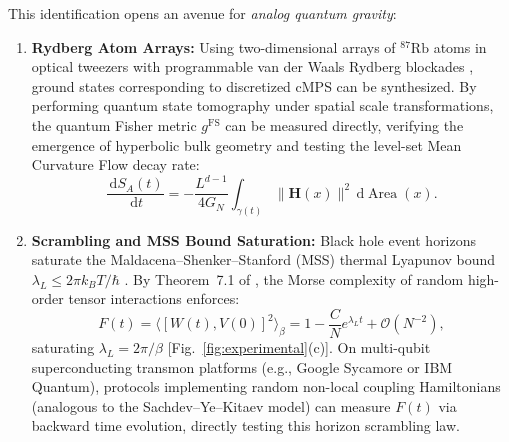 \documentclass[aps,prl,reprint,twocolumn,superscriptaddress,nofootinbib,floatfix]{revtex4-2}
\newcommand{\dif}{\,\mathrm{d}}
\newcommand{\Area}{\operatorname{Area}}
\begin{document}
This identification opens an avenue for \emph{analog quantum gravity}:
\begin{enumerate}[label=(\alph*)]
    \item \textbf{Rydberg Atom Arrays:} Using two-dimensional arrays of $^{87}\mathrm{Rb}$ atoms in optical tweezers with programmable van der Waals Rydberg blockades \cite{ebadi2021quantum}, ground states corresponding to discretized cMPS can be synthesized. By performing quantum state tomography under spatial scale transformations, the quantum Fisher metric $g^{\mathrm{FS}}$ can be measured directly, verifying the emergence of hyperbolic bulk geometry and testing the level-set Mean Curvature Flow decay rate:
    \begin{equation}
        \frac{\dif S_A(t)}{\dif t} = -\frac{L^{d-1}}{4 G_N} \int_{\gamma(t)} \|\mathbf{H}(x)\|^2 \dif \Area(x).
    \end{equation}
    \item \textbf{Scrambling and MSS Bound Saturation:} Black hole event horizons saturate the Maldacena--Shenker--Stanford (MSS) thermal Lyapunov bound $\lambda_L \le 2\pi k_B T / \hbar$ \cite{maldacena2016bound}. By Theorem~7.1 of \cite{turing2026grand}, the Morse complexity of random high-order tensor interactions enforces:
    \begin{equation}
        F(t) = \langle [W(t), V(0)]^2 \rangle_\beta = 1 - \frac{C}{N} e^{\lambda_L t} + \mathcal{O}(N^{-2}),
    \end{equation}
    saturating $\lambda_L = 2\pi / \beta$ [Fig.~\ref{fig:experimental}(c)]. On multi-qubit superconducting transmon platforms (e.g., Google Sycamore or IBM Quantum), protocols implementing random non-local coupling Hamiltonians (analogous to the Sachdev--Ye--Kitaev model) can measure $F(t)$ via backward time evolution, directly testing this horizon scrambling law.
\end{enumerate}
\end{document}
